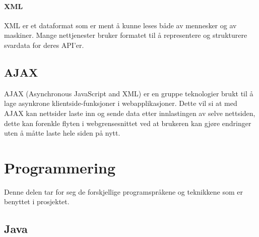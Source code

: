 \documentclass[../main.tex]{subfiles}
\begin{document}
\paragraph{XML}

XML er et dataformat som er ment å kunne leses både av mennesker og av maskiner. Mange nettjenester bruker formatet til å representere og strukturere svardata for deres API’er.  

\subsection{AJAX}

AJAX (Asynchronous JavaScript and XML) er en gruppe teknologier brukt til å lage asynkrone klientside-funksjoner i webapplikasjoner. Dette vil si at med AJAX kan nettsider laste inn og sende data etter innlastingen av selve nettsiden, dette kan forenkle flyten i webgrensesnittet ved at brukeren kan gjøre endringer uten å måtte laste hele siden på nytt.  

\section{Programmering}

Denne delen tar for seg de forskjellige programspråkene og teknikkene som er benyttet i prosjektet.

\subsection{Java}
\end{document}

